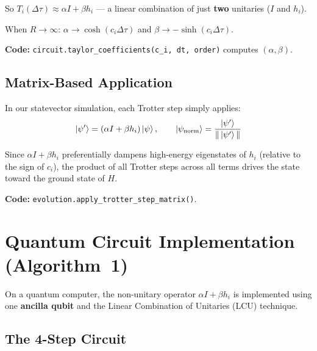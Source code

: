\documentclass[11pt,a4paper]{article}
\begin{document}
So $T_i(\Delta\tau) \approx \alpha I + \beta h_i$ --- a linear combination of just \textbf{two} unitaries ($I$ and $h_i$).

When $R \to \infty$: $\alpha \to \cosh(c_i\Delta\tau)$ and $\beta \to -\sinh(c_i\Delta\tau)$.

\vspace{0.3em}
\noindent\textbf{Code:} \texttt{circuit.taylor\_coefficients(c\_i, dt, order)} computes $(\alpha, \beta)$.

\subsection{Matrix-Based Application}

In our statevector simulation, each Trotter step simply applies:
\begin{equation}
  \ket{\psi'} = (\alpha I + \beta h_i)\ket{\psi}, \qquad
  \ket{\psi_{\text{norm}}} = \frac{\ket{\psi'}}{\|\ket{\psi'}\|}
\end{equation}

Since $\alpha I + \beta h_i$ preferentially dampens high-energy eigenstates of $h_i$ (relative to the sign of $c_i$), the product of all Trotter steps across all terms drives the state toward the ground state of $H$.

\vspace{0.3em}
\noindent\textbf{Code:} \texttt{evolution.apply\_trotter\_step\_matrix()}.


\section{Quantum Circuit Implementation (Algorithm~1)}

On a quantum computer, the non-unitary operator $\alpha I + \beta h_i$ is implemented using one \textbf{ancilla qubit} and the Linear Combination of Unitaries (LCU) technique.

\subsection{The 4-Step Circuit}
\end{document}
